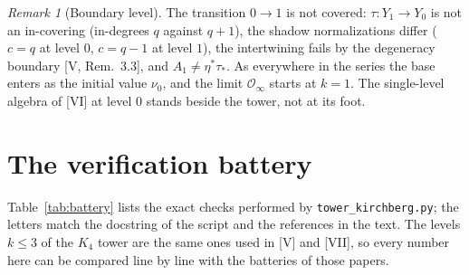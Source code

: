 \documentclass[11pt]{amsart}
\numberwithin{equation}{section}
\theoremstyle{definition}
\theoremstyle{remark}
\newtheorem{remark}[theorem]{Remark}
\newcommand{\cO}{\mathcal{O}}
\newcommand{\ta}{\tau_*}
\newcommand{\etp}{\eta^*}
\begin{document}
\begin{remark}[Boundary level]\label{rem:boundary}
The transition $0\to1$ is not covered: $\tau\colon Y_1\to Y_0$ is not an in-covering
(in-degrees $q$ against $q{+}1$), the shadow normalizations differ ($c=q$ at level $0$,
$c=q-1$ at level $1$), the intertwining fails by the degeneracy boundary [V, Rem.~3.3],
and $A_1\ne\etp\ta$. As everywhere in the series the base enters as the initial value
$\nu_0$, and the limit $\cO_\infty$ starts at $k=1$. The single-level algebra of [VI] at
level $0$ stands beside the tower, not at its foot.
\end{remark}

\section{The verification battery}\label{sec:battery}

Table~\ref{tab:battery} lists the exact checks performed by \texttt{tower\_kirchberg.py};
the letters match the docstring of the script and the references in the text. The
levels $k\le3$ of the $K_4$ tower are the same ones used in [V] and [VII], so every
number here can be compared line by line with the batteries of those papers.
\end{document}
